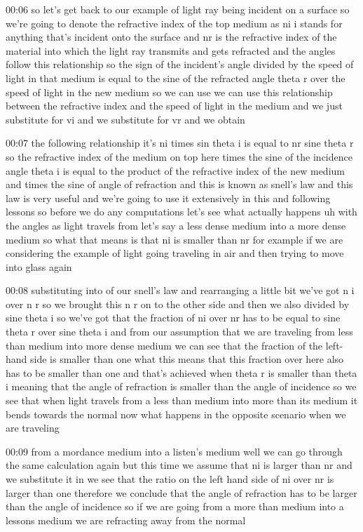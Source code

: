 00:06
so let's get back to our example of light ray being incident on a surface
so we're going to denote the refractive index of the top medium as ni
i stands for anything that's incident onto the surface
and nr is the refractive index of the material
into which the light ray transmits and gets refracted
and the angles follow this relationship so the sign of the incident's angle
divided by the speed of light in that medium
is equal to the sine of the refracted angle theta r over the speed of light
in the new medium so we can use we can use this relationship
between the refractive index and the speed of light in the medium
and we just substitute for vi and we substitute for vr and we obtain

00:07
the following relationship it's ni times sin theta i is equal to nr sine theta
r so the refractive index of the medium on top here times the sine of the
incidence angle theta i is equal to the product of the
refractive index of the new medium and times the sine of
angle of refraction and this is known as snell's law
and this law is very useful and we're going to use it extensively
in this and following lessons so before we do any computations let's
see what actually happens uh with the angles as light travels from
let's say a less dense medium into a more dense medium
so what that means is that ni is smaller than nr
for example if we are considering the example of light
going traveling in air and then trying to move into glass again

00:08
substituting into of our snell's law and rearranging a little bit
we've got n i over n r so we brought this n
r on to the other side and then we also divided by
sine theta i so we've got that the fraction of ni over nr
has to be equal to sine theta r over sine
theta i and from our assumption that we are traveling from less than medium into
more dense medium we can see that the fraction of the left-hand side
is smaller than one what this means that this fraction over here
also has to be smaller than one and that's achieved when
theta r is smaller than theta i meaning that the angle of refraction is
smaller than the angle of incidence so we see that when light travels from a
less than medium into more than its medium it bends towards the normal now
what happens in the opposite scenario when we are traveling

00:09
from a mordance medium into a listen's medium well we can go through the same
calculation again but this time we assume that ni is larger than nr
and we substitute it in we see that the ratio on the
left hand side of ni over nr is larger than one
therefore we conclude that the angle of refraction
has to be larger than the angle of incidence so
if we are going from a more than medium into a lessons medium
we are refracting away from the normal

